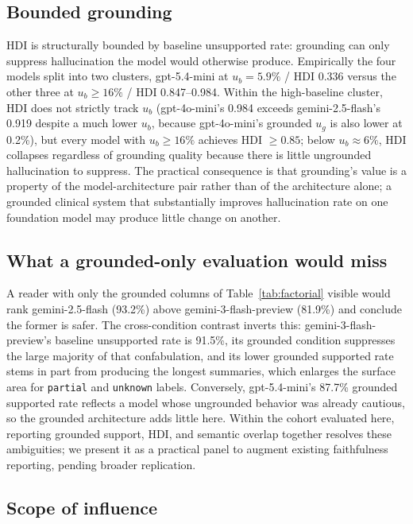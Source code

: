\documentclass{article}
\theoremstyle{plain}
\begin{document}
\subsection{Bounded grounding}

HDI is structurally bounded by baseline unsupported rate: grounding can only suppress hallucination the model would otherwise produce. Empirically the four models split into two clusters, gpt-5.4-mini at $u_b{=}5.9\%$ / HDI 0.336 versus the other three at $u_b \geq 16\%$ / HDI 0.847--0.984. Within the high-baseline cluster, HDI does not strictly track $u_b$ (gpt-4o-mini's 0.984 exceeds gemini-2.5-flash's 0.919 despite a much lower $u_b$, because gpt-4o-mini's grounded $u_g$ is also lower at 0.2\%), but every model with $u_b \geq 16\%$ achieves HDI $\geq 0.85$; below $u_b \approx 6\%$, HDI collapses regardless of grounding quality because there is little ungrounded hallucination to suppress. The practical consequence is that grounding's value is a property of the model-architecture pair rather than of the architecture alone; a grounded clinical system that substantially improves hallucination rate on one foundation model may produce little change on another.

\subsection{What a grounded-only evaluation would miss}

A reader with only the grounded columns of Table~\ref{tab:factorial} visible would rank gemini-2.5-flash (93.2\%) above gemini-3-flash-preview (81.9\%) and conclude the former is safer. The cross-condition contrast inverts this: gemini-3-flash-preview's baseline unsupported rate is 91.5\%, its grounded condition suppresses the large majority of that confabulation, and its lower grounded supported rate stems in part from producing the longest summaries, which enlarges the surface area for \texttt{partial} and \texttt{unknown} labels. Conversely, gpt-5.4-mini's 87.7\% grounded supported rate reflects a model whose ungrounded behavior was already cautious, so the grounded architecture adds little here. Within the cohort evaluated here, reporting grounded support, HDI, and semantic overlap together resolves these ambiguities; we present it as a practical panel to augment existing faithfulness reporting, pending broader replication.

\subsection{Scope of influence}
\label{sec:influence}
\end{document}
